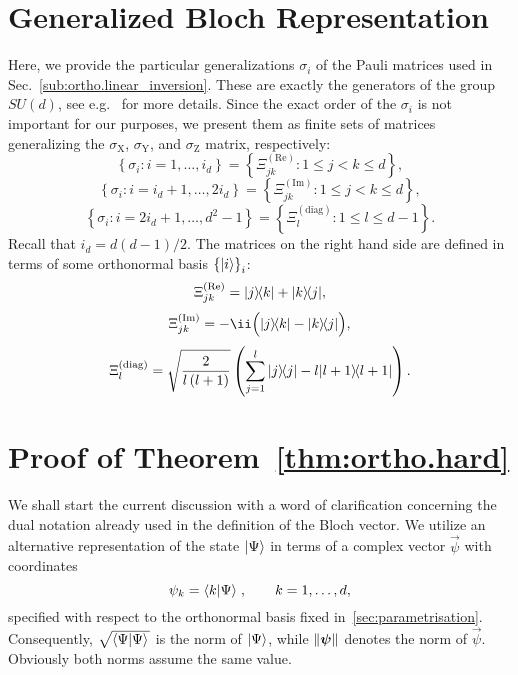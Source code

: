 \section{Generalized Bloch Representation}
\label{sec:error.parametrisation}

Here, we provide the particular generalizations $\sigma_{i}$ of the Pauli matrices used in Sec.~\ref{sub:ortho.linear_inversion}.
These are exactly the generators of the group $SU(d)$, see e.g.~\cite{Kimura_2003_Bloch,Byrd_2003_Characterization} for more details.
Since the exact order of the $\sigma_{i}$ is not important for our purposes, we present them as finite sets of matrices generalizing the $\sigma_\mathrm{X}$, $\sigma_\mathrm{Y}$, and $\sigma_\mathrm{Z}$ matrix, respectively:
\begin{equation}
  \left\{ \sigma_{i}:i=1,\ldots,i_{d}\right\} =\left\{ \Xi_{jk}^{(\textrm{Re})}:1\leq j<k\leq d\right\} ,
\end{equation}
\begin{equation}
  \left\{ \sigma_{i}:i=i_{d}+1,\ldots,2i_{d}\right\} =\left\{ \Xi_{jk}^{(\textrm{Im})}:1\leq j<k\leq d\right\} ,
\end{equation}
\begin{equation}
  \left\{ \sigma_{i}:i=2i_{d}+1,\ldots,d^{2}-1\right\} =\left\{ \Xi_{l}^{(\textrm{diag})}:1\leq l\leq d-1\right\} .
\end{equation}
Recall that $i_{d}=d(d-1)/2$.
The matrices on the right hand side are defined in terms of some orthonormal basis ${\{\ket{i}\}}_i$:
\begin{equation}
  \Xi_{jk}^{(\textrm{Re})} =  \ket{j}\bra{k} + \ket{k}\bra{j},
\end{equation}
\begin{equation}
  \Xi_{jk}^{(\textrm{Im})} = -\ii \Big(\ket{j}\bra{k} - \ket{k}\bra{j}\Big),
\end{equation}
\begin{equation}
  \Xi_{l}^{(\textrm{diag})} = \sqrt{\frac{2}{l\left(l+1\right)}}\left(\sum_{j=1}^{l} \ket{j}\bra{j} - l \ket{l+1}\bra{l+1} \right).
\end{equation}


\section{Proof of Theorem~\ref{thm:ortho.hard}}
\label{sec:error.ellpos}

We shall start the current discussion with a word of clarification concerning the dual notation already used in the definition of the Bloch vector. We utilize an alternative representation of the state $\ket{\Psi} $ in terms of a complex vector $\vec{\psi}$ with coordinates
\begin{equation}
  \psi_{k}=\left\langle k \ket{\Psi} \right.,\qquad k=1,\ldots,d,\label{coordinates}
\end{equation}
specified with respect to the orthonormal basis fixed in~\ref{sec:parametrisation}.
Consequently,  $\sqrt{\left\langle \Psi \ket{\Psi} \right.}$ is the  norm of $\ket{\Psi}$, while ${\Vert{\boldsymbol{\psi}}\Vert}$ denotes the norm of $\vec\psi$. Obviously both norms assume the same value.

